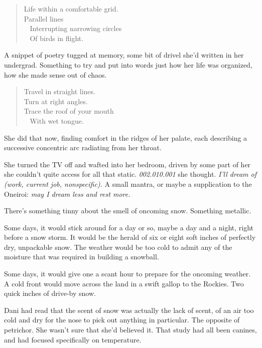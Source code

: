 \begin{quote}
Life within a comfortable grid.\\
Parallel lines\\
\hspace*{0.333em} ~ Interrupting narrowing circles\\
\hspace*{0.333em} ~ Of birds in flight.
\end{quote}

A snippet of poetry tugged at memory, some bit of drivel she'd written in her undergrad. Something to try and put into words just how her life was organized, how she made sense out of chaos.

\begin{quote}
Travel in straight lines.\\
Turn at right angles.\\
Trace the roof of your mouth\\
\hspace*{0.333em} ~ With wet tongue.
\end{quote}

She did that now, finding comfort in the ridges of her palate, each describing a successive concentric arc radiating from her throat.

She turned the TV off and wafted into her bedroom, driven by some part of her she couldn't quite access for all that static. \emph{002.010.001} she thought. \emph{I'll dream of (work, current job, nonspecific).} A small mantra, or maybe a supplication to the Oneiroi: \emph{may I dream less and rest more.}

\secdiv{}

\noindent There's something tinny about the smell of oncoming snow. Something metallic.

Some days, it would stick around for a day or so, maybe a day and a night, right before a snow storm. It would be the herald of six or eight soft inches of perfectly dry, unpackable snow. The weather would be too cold to admit any of the moisture that was required in building a snowball.

Some days, it would give one a scant hour to prepare for the oncoming weather. A cold front would move across the land in a swift gallop to the Rockies. Two quick inches of drive-by snow.

Dani had read that the scent of snow was actually the lack of scent, of an air too cold and dry for the nose to pick out anything in particular. The opposite of petrichor. She wasn't sure that she'd believed it. That study had all been canines, and had focused specifically on temperature.

